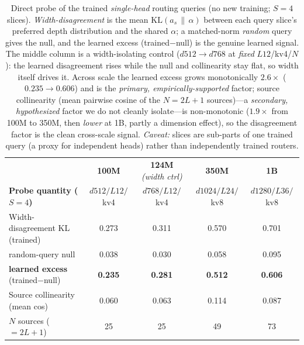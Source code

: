 \documentclass{article}
\begin{document}
\begin{table}[h]
\centering
\caption{Direct probe of the trained \emph{single-head} routing queries (no new
training; $S{=}4$ slices). \emph{Width-disagreement} is the mean
$\mathrm{KL}(a_s\,\|\,\alpha)$ between each query slice's preferred depth
distribution and the shared $\alpha$; a matched-norm \emph{random} query gives the
null, and the learned excess (trained$-$null) is the genuine learned signal. The
middle column is a width-isolating control ($d512{\to}d768$ at \emph{fixed} $L12$/kv4/$N$):
the learned disagreement rises while the null and collinearity stay flat, so width
itself drives it. Across scale the learned excess grows monotonically $2.6\times$
($0.235\!\to\!0.606$) and is the \emph{primary, empirically-supported} factor;
source collinearity (mean pairwise cosine of the $N{=}2L{+}1$ sources)---a
\emph{secondary, hypothesized} factor we do not cleanly isolate---is non-monotonic
($1.9\times$ from 100M to 350M, then \emph{lower} at 1B, partly a dimension
effect), so the disagreement factor is the clean cross-scale signal.
\emph{Caveat:} slices are sub-parts of one trained query (a proxy for independent
heads) rather than independently trained routers.}
\label{tab:probe}
\small
\setlength{\tabcolsep}{3pt}
\begin{tabular}{lcccc}
\toprule
 & \textbf{100M} & \textbf{124M} \emph{(width ctrl)} & \textbf{350M} & \textbf{1B} \\
\textbf{Probe quantity ($S{=}4$)} & $d512/L12/$kv4 & $d768/L12/$kv4 & $d1024/L24/$kv8 & $d1280/L36/$kv8 \\
\midrule
Width-disagreement KL (trained) & 0.273 & 0.311 & 0.570 & 0.701 \\
\quad random-query null          & 0.038 & 0.030 & 0.058 & 0.095 \\
\quad \textbf{learned excess} (trained$-$null) & \textbf{0.235} & \textbf{0.281} & \textbf{0.512} & \textbf{0.606} \\
Source collinearity (mean cos)  & 0.060 & 0.063 & 0.114 & 0.087 \\
$N$ sources ($=2L{+}1$)         & 25    & 25    & 49    & 73 \\
\bottomrule
\end{tabular}
\end{table}
\end{document}
